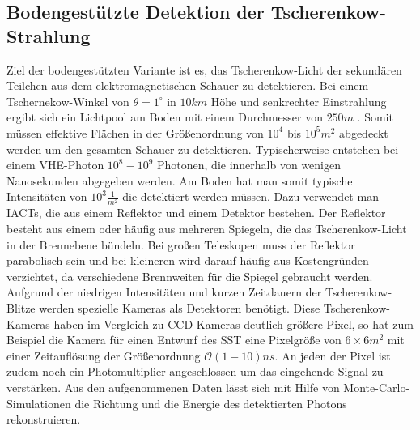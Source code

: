 \subsection{Bodengestützte Detektion der Tscherenkow-Strahlung}
Ziel der bodengestützten Variante ist es, das Tscherenkow-Licht der sekundären Teilchen aus dem elektromagnetischen Schauer zu detektieren. Bei einem Tschernekow-Winkel von $\theta=1^{\circ}$ in $10\unit{km}$ Höhe und senkrechter Einstrahlung ergibt sich ein Lichtpool am Boden mit einem Durchmesser von $250\unit{m}$ \cite{DesignConcept}. Somit müssen effektive Flächen in der Größenordnung von $10^4$ bis $10^5\unit{m^2}$ abgedeckt werden um den gesamten Schauer zu detektieren. Typischerweise entstehen bei einem VHE-Photon $10^8-10^9$ Photonen, die innerhalb von wenigen Nanosekunden abgegeben werden. Am Boden hat man somit typische Intensitäten von $10^3\unit{\frac{1}{m^2}}$ die detektiert werden müssen.
Dazu verwendet man IACTs, die aus einem Reflektor und einem Detektor bestehen. Der Reflektor besteht aus einem oder häufig aus mehreren Spiegeln, die das Tscherenkow-Licht in der Brennebene bündeln. Bei großen Teleskopen muss der Reflektor parabolisch sein und bei kleineren wird darauf häufig aus Kostengründen verzichtet, da verschiedene Brennweiten für die Spiegel gebraucht werden.
Aufgrund der niedrigen Intensitäten und kurzen Zeitdauern der Tscherenkow-Blitze werden spezielle Kameras als Detektoren benötigt. Diese Tscherenkow-Kameras haben im Vergleich zu CCD-Kameras deutlich größere Pixel, so hat zum Beispiel die Kamera für einen Entwurf des SST \cite{gct} eine Pixelgröße von $6 \times 6\unit{m^2}$ mit einer Zeitauflösung der Größenordnung $\mathcal{O}(1-10)\unit{ns}$. An jeden der Pixel ist zudem noch ein Photomultiplier angeschlossen um das eingehende Signal zu verstärken. Aus den aufgenommenen Daten lässt sich mit Hilfe von Monte-Carlo-Simulationen die Richtung und die Energie des detektierten Photons rekonstruieren. 

